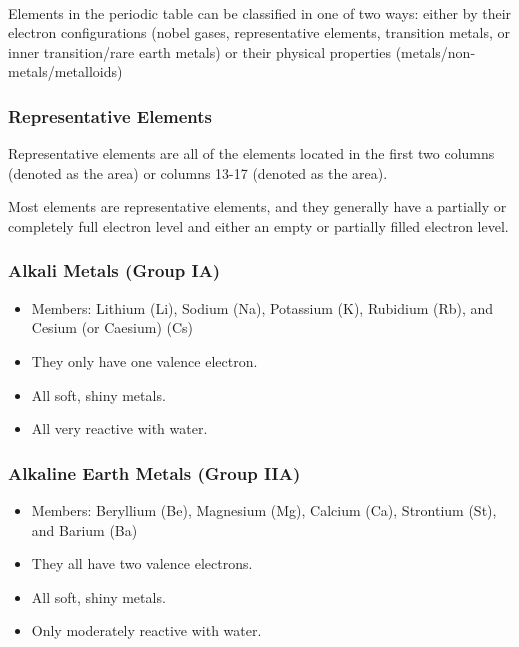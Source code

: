 \noindent
{} \\

\noindent
Elements in the periodic table can be classified in one of two ways: either by their electron configurations (nobel gases, representative elements, transition metals, or inner transition/rare earth metals) or their physical properties (metals/non-metals/metalloids)

\subsubsection{Representative Elements}

\begin{defn}
Representative elements are all of the elements located in the first two columns (denoted as the  area) or columns 13-17 (denoted as the  area).
\end{defn}

\noindent
Most elements are representative elements, and they generally have a partially or completely full  electron level and either an empty or partially filled  electron level.

\subsubsection{Alkali Metals (Group IA)}

\begin{itemize}
\item Members: Lithium (Li), Sodium (Na), Potassium (K), Rubidium (Rb), and Cesium (or Caesium) (Cs)
\item They only have one valence electron.
\item All soft, shiny metals.
\item All very reactive with water.
\end{itemize}

\subsubsection{Alkaline Earth Metals (Group IIA)}

\begin{itemize}
\item Members: Beryllium (Be), Magnesium (Mg), Calcium (Ca), Strontium (St), and Barium (Ba)
\item They all have two valence electrons.
\item All soft, shiny metals.
\item Only moderately reactive with water.
\end{itemize}


